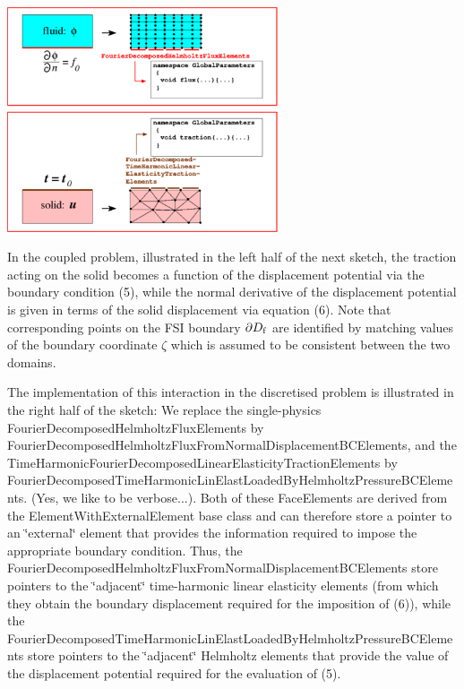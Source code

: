  
\begin{DoxyImage}
\includegraphics[width=0.6\textwidth]{single_physics}
\end{DoxyImage}


In the coupled problem, illustrated in the left half of the next sketch, the traction acting on the solid becomes a function of the displacement potential via the boundary condition (5), while the normal derivative of the displacement potential is given in terms of the solid displacement via equation (6). Note that corresponding points on the F\+SI boundary $ \partial D_{\rm f}$ are identified by matching values of the boundary coordinate $ \zeta $ which is assumed to be consistent between the two domains.

The implementation of this interaction in the discretised problem is illustrated in the right half of the sketch\+: We replace the single-\/physics {\ttfamily Fourier\+Decomposed\+Helmholtz\+Flux\+Elements} by {\ttfamily Fourier\+Decomposed\+Helmholtz\+Flux\+From\+Normal\+Displacement\+B\+C\+Elements}, and the {\ttfamily Time\+Harmonic\+Fourier\+Decomposed\+Linear\+Elasticity\+Traction\+Elements} by {\ttfamily Fourier\+Decomposed\+Time\+Harmonic\+Lin\+Elast\+Loaded\+By\+Helmholtz\+Pressure\+B\+C\+Elements}. (Yes, we like to be verbose...). Both of these {\ttfamily Face\+Elements} are derived from the {\ttfamily Element\+With\+External\+Element} base class and can therefore store a pointer to an \char`\"{}external\char`\"{} element that provides the information required to impose the appropriate boundary condition. Thus, the {\ttfamily Fourier\+Decomposed\+Helmholtz\+Flux\+From\+Normal\+Displacement\+B\+C\+Elements} store pointers to the \char`\"{}adjacent\char`\"{} time-\/harmonic linear elasticity elements (from which they obtain the boundary displacement required for the imposition of (6)), while the {\ttfamily Fourier\+Decomposed\+Time\+Harmonic\+Lin\+Elast\+Loaded\+By\+Helmholtz\+Pressure\+B\+C\+Elements} store pointers to the \char`\"{}adjacent\char`\"{} Helmholtz elements that provide the value of the displacement potential required for the evaluation of (5).

